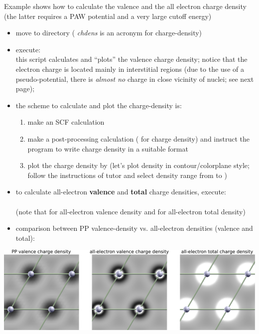 \documentclass[landscape]{foils}
\begin{document}
%
Example  shows how to calculate the
valence and the all electron charge density (the latter requires a PAW
potential and a very large cutoff energy)
\begin{itemize}
\item move to  directory ({\it
    chdens} is an acronym for charge-density)
\item execute: ~\\
  this script calculates and ``plots'' the valence charge density;
  notice that the electron charge is located mainly in interstitial
  regions (due to the use of a pseudo-potential, there is {\it almost
    no} charge in close vicinity of nuclei; see next page);
\item the scheme to calculate and plot the charge-density is:
  \begin{enumerate}
  \item make an SCF  calculation
  \item make a post-processing  calculation
    ( for charge density) and instruct the program to
    write charge density in a suitable format
  \item plot the charge density by  (let's plot density
    in contour/colorplane style; follow the instructions of tutor and
    select density range from  to )
  \end{enumerate}
\end{itemize}


\begin{itemize}
\item to calculate all-electron {\bf valence} and {\bf total} charge densities,
  execute:\\[0.5em]
  \\[0.5em]
  (note that  for all-electron valence density and
   for all-electron total density)

\item comparison between PP valence-density vs.\@{} all-electron densities
  (valence and total):
\end{itemize}
\centerline{\includegraphics[width=1.0\textwidth]{figs/Al-chdens.pdf}}
\end{document}
